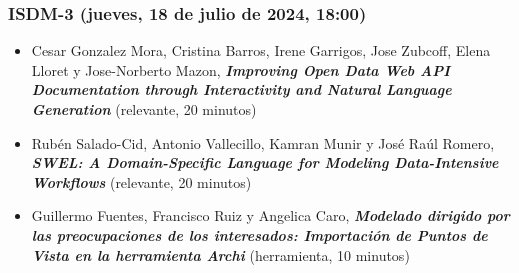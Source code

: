 \begin{frame}
  \frametitle{ISDM-3 (jueves, 18 de julio de 2024, 18:00)}
\begin{itemize}

\item \small{Cesar Gonzalez Mora, Cristina Barros, Irene Garrigos, Jose Zubcoff, Elena Lloret y Jose-Norberto Mazon}, %
      {\bfseries\itshape Improving Open Data Web API Documentation through Interactivity and Natural Language Generation} %
      \small{(relevante, 20 minutos)}

\item \small{Rubén Salado-Cid, Antonio Vallecillo, Kamran Munir y José Raúl Romero}, %
      {\bfseries\itshape SWEL: A Domain-Specific Language for Modeling Data-Intensive Workflows} %
      \small{(relevante, 20 minutos)}

\item \small{Guillermo Fuentes, Francisco Ruiz y Angelica Caro}, %
      {\bfseries\itshape Modelado dirigido por las preocupaciones de los interesados: Importación de Puntos de Vista en la herramienta Archi} %
      \small{(herramienta, 10 minutos)}

\end{itemize}
\end{frame}